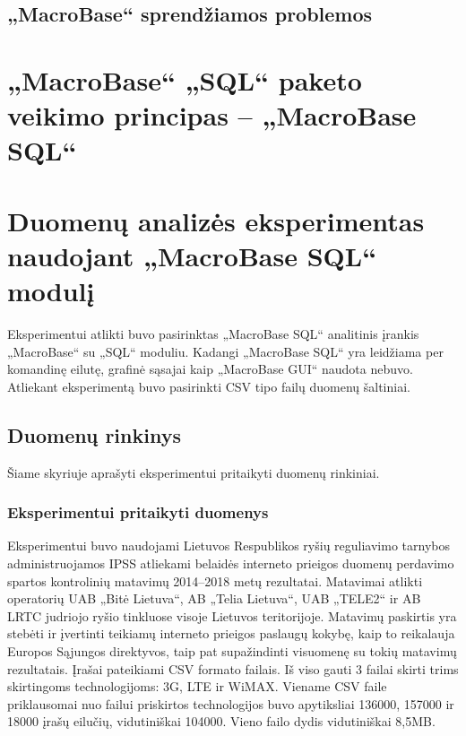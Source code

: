 \documentclass{VUMIFPSbakalaurinis}
\begin{document}
\subsection{„MacroBase“ sprendžiamos problemos} \label{subsec:problems}




\section{„MacroBase“ „SQL“ paketo veikimo principas – „MacroBase SQL“} \label{sec:macrobasesql}




\section{Duomenų analizės eksperimentas naudojant „MacroBase SQL“ modulį}
Eksperimentui atlikti buvo pasirinktas „MacroBase SQL“ analitinis įrankis „MacroBase“ su „SQL“ moduliu. Kadangi „MacroBase SQL“ yra leidžiama per komandinę eilutę, grafinė sąsajai kaip „MacroBase GUI“ naudota nebuvo. Atliekant eksperimentą buvo pasirinkti CSV tipo failų duomenų šaltiniai.

\subsection{Duomenų rinkinys}
Šiame skyriuje aprašyti eksperimentui pritaikyti duomenų rinkiniai.

\subsubsection{Eksperimentui pritaikyti duomenys}
Eksperimentui buvo naudojami Lietuvos Respublikos ryšių reguliavimo tarnybos administruojamos IPSS atliekami belaidės interneto prieigos duomenų perdavimo spartos kontrolinių matavimų 2014–2018 metų rezultatai. Matavimai atlikti operatorių UAB „Bitė Lietuva“, AB „Telia Lietuva“, UAB „TELE2“ ir AB LRTC judriojo ryšio tinkluose visoje Lietuvos teritorijoje. Matavimų paskirtis yra stebėti ir įvertinti teikiamų interneto prieigos paslaugų kokybę, kaip to reikalauja Europos Sąjungos direktyvos, taip pat supažindinti visuomenę su tokių matavimų rezultatais. Įrašai pateikiami CSV formato failais. Iš viso gauti 3 failai skirti trims skirtingoms technologijoms: 3G, LTE ir WiMAX. Viename CSV faile priklausomai nuo failui priskirtos technologijos buvo apytiksliai 136000, 157000 ir 18000 įrašų eilučių, vidutiniškai 104000. Vieno failo dydis vidutiniškai 8,5MB.
\end{document}
